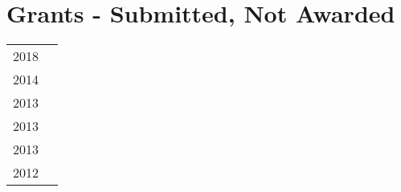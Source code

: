 \section*{Grants - Submitted, Not Awarded}
\begin{tabular}{L!{\VRule}R}
2018&\\
2014&\\
2013&\\
2013&\\
2013&\\
2012&\\
\end{tabular}